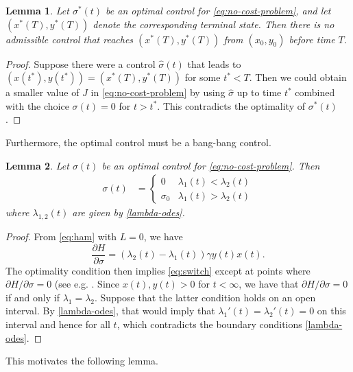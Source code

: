 \documentclass[english,12pt,letter]{article}
\newtheorem{lem}{Lemma}
\begin{document}
\begin{lem} \label{lem:min-time}
Let $\sigma^*(t)$ be an optimal control for \eqref{eq:no-cost-problem}, and
let $(x^*(T),y^*(T))$ denote the corresponding terminal state.
Then there is no admissible control that reaches $(x^*(T),y^*(T))$ from $(x_0,y_0)$
before time $T$.
\end{lem}
\begin{proof}
Suppose there were a control $\hat{\sigma}(t)$ that leads to $(x(t^*),y(t^*)) = (x^*(T),y^*(T))$ for some $t^*<T$.  Then
we could obtain a smaller value of $J$ in \eqref{eq:no-cost-problem} by using
$\hat{\sigma}$ up to time $t^*$ combined with the choice $\sigma(t)=0$ for $t>t^*$.
This contradicts the optimality of $\sigma^*(t)$.
\end{proof}

Furthermore, the optimal control must be a bang-bang control.
\begin{lem} \label{lem:bang-bang}
Let $\sigma(t)$ be an optimal control for \eqref{eq:no-cost-problem}.
Then
\begin{align} \label{eq:switch}
    \sigma(t) & = \begin{cases} 0 & \lambda_1(t)<\lambda_2(t) \\ \sigma_0 & \lambda_1(t) > \lambda_2(t) \end{cases}
\end{align}
where $\lambda_{1,2}(t)$ are given by \eqref{lambda-odes}.
\end{lem}
\begin{proof}
From \eqref{eq:ham} with $L=0$, we have
$$
\frac{\partial H}{\partial \sigma} = (\lambda_2(t)-\lambda_1(t))\gamma y(t) x(t).
$$
The optimality condition then implies \eqref{eq:switch} except at points where $\partial H/\partial \sigma=0$
(see e.g. \cite[Ch. 17]{lenhart2007optimal}.
Since $x(t),y(t) >0$ for $t<\infty$, we have that $\partial H/\partial \sigma=0$
if and only if $\lambda_1=\lambda_2$.  Suppose that the latter condition holds on
an open interval.  By \eqref{lambda-odes}, that would imply that $\lambda_1'(t) = \lambda_2'(t)=0$ on this
interval and hence for all $t$, which contradicts the boundary conditions \eqref{lambda-odes}.
\end{proof}

This motivates the following lemma.
\end{document}
